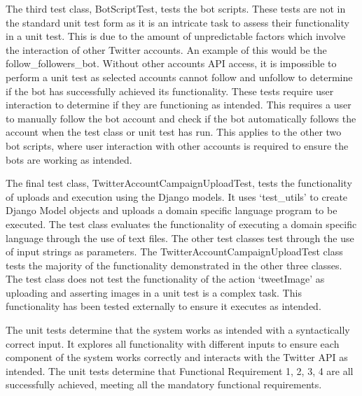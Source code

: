 The third test class, BotScriptTest, tests the bot scripts. These tests are not in the standard unit test form as it is an intricate task to assess their functionality in a unit test. This is due to the amount of unpredictable factors which involve the interaction of other Twitter accounts. An example of this would be the follow\_followers\_bot. Without other accounts API access, it is impossible to perform a unit test as selected accounts cannot follow and unfollow to determine if the bot has successfully achieved its functionality. These tests require user interaction to determine if they are functioning as intended. This requires a user to manually follow the bot account and check if the bot automatically follows the account when the test class or unit test has run. This applies to the other two bot scripts, where user interaction with other accounts is required to ensure the bots are working as intended. \newline \par

The final test class, TwitterAccountCampaignUploadTest, tests the functionality of uploads and execution using the Django models. It uses `test\_utils' to create Django Model objects and uploads a domain specific language program to be executed. The test class evaluates the functionality of executing a domain specific language through the use of text files. The other test classes test through the use of input strings as parameters. The TwitterAccountCampaignUploadTest class tests the majority of the functionality demonstrated in the other three classes. The test class does not test the functionality of the action `tweetImage' as uploading and asserting images in a unit test is a complex task. This functionality has been tested externally to ensure it executes as intended. \newline \par

The unit tests determine that the system works as intended with a syntactically correct input. It explores all functionality with different inputs to ensure each component of the system works correctly and interacts with the Twitter API as intended. The unit tests determine that Functional Requirement 1, 2, 3, 4 are all successfully achieved, meeting all the mandatory functional requirements. \newline \par

